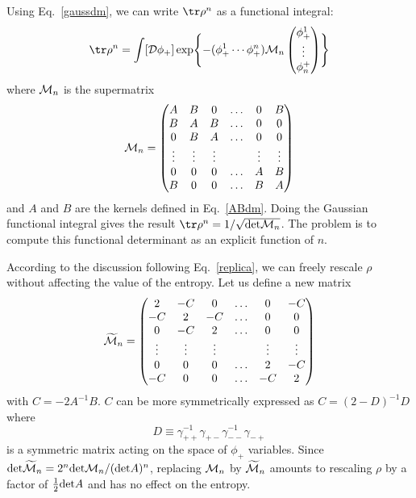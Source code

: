 \documentclass[12pt]{article}
\begin{document}
Using Eq.~\ref{gaussdm}, we can write $\tr\rho^n$ as a functional integral:
\begin{equation}
\tr\rho^n =
\int [{\cal D} \phi_+] \exp
 \Biggl\{ -(\phi^1_+ \cdots \phi^n_+) {\cal M}_n
\begin{pmatrix}
\phi^1_+\\ \vdots\\ \phi^+_n \\
\end{pmatrix}
\Biggr\}
\end{equation}
where ${\cal M}_n$ is the supermatrix
\begin{equation}
{\cal M}_n = 
\begin{pmatrix}
A & B & 0 & \ldots & 0 & B \\
B & A & B & \ldots & 0 & 0 \\
0 & B & A & \ldots & 0 & 0 \\
\vdots & \vdots & \vdots && \vdots & \vdots \\
0 & 0 & 0 & \ldots & A & B \\
B & 0 & 0 & \ldots & B & A \\
\end{pmatrix}
\end{equation}
and $A$ and $B$ are the kernels defined in Eq.~\ref{ABdm}. Doing the Gaussian
functional integral gives the result $\tr\rho^n =1/\sqrt{{\rm det}{\cal
M}_
 n}$.
The problem is to compute this functional determinant as an explicit
function of $n$.

According to the discussion following Eq.~\ref{replica}, we can freely rescale
$\rho$ without affecting the value of the entropy. Let us define a new matrix
\begin{equation}
\widetilde{\cal M}_n =
\begin{pmatrix}
2 & -C & 0 & \ldots & 0& -C\cr
-C & 2 & -C & \ldots & 0 & 0\cr
 0 & -C & 2 & \ldots & 0 & 0\cr
\vdots & \vdots & \vdots &&\vdots & \vdots\cr
0 & 0 & 0 & \ldots & 2 & -C\cr
-C & 0 & 0 & \ldots & -C & 2\cr
\end{pmatrix}
\end{equation}
with $C=-2A^{-1}B$. $C$ can be more symmetrically expressed as
$C = (2-D)^{-1}D$ where
\begin{equation}
D \equiv \gamma_{++}^{-1}\gamma_{+-} \gamma_{--}^{-1}\gamma_{-+}
\label{entmat}
\end{equation}
is a symmetric matrix acting on the space of $\phi_+$ variables.
Since ${\rm det}\widetilde{\cal M}_n =
2^n {{\rm det}{\cal M}_n / ({\rm det} A)^n}$, replacing ${\cal M}_n$ by
$\widetilde{\cal M}_n$ amounts to rescaling $\rho$ by a factor of
${1\over 2}{\rm det} A$
and has no effect on the entropy.
\end{document}
